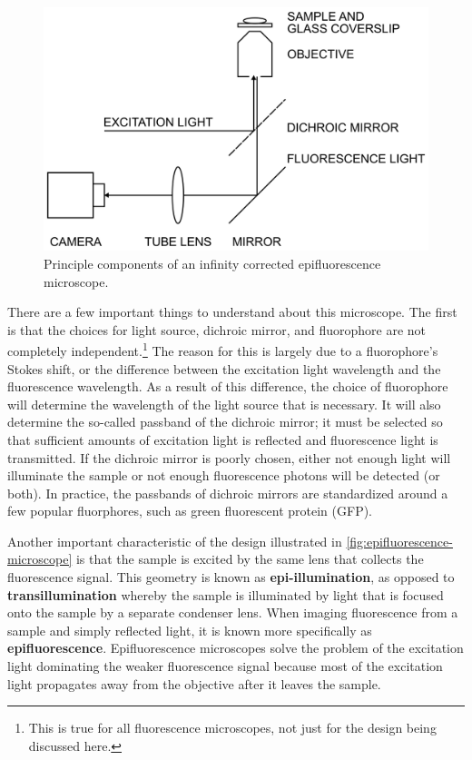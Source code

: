 \documentclass[10pt,a4paper]{book}
\begin{document}
\begin{figure}[ht]
    \centering
    \includegraphics{epifluorescence-microscope.png}
    \caption{Principle components of an infinity corrected epifluorescence microscope.}
    \label{fig:epifluorescence-microscope}
\end{figure}

There are a few important things to understand about this microscope. The first is that the choices for light source, dichroic mirror, and fluorophore are not completely independent.\footnote{This is true for all fluorescence microscopes, not just for the design being discussed here.} The reason for this is largely due to a fluorophore's Stokes shift, or the difference between the excitation light wavelength and the fluorescence wavelength. As a result of this difference, the choice of fluorophore will determine the wavelength of the light source that is necessary. It will also determine the so-called passband of the dichroic mirror; it must be selected so that sufficient amounts of excitation light is reflected and fluorescence light is transmitted. If the dichroic mirror is poorly chosen, either not enough light will illuminate the sample or not enough fluorescence photons will be detected (or both). In practice, the passbands of dichroic mirrors are standardized around a few popular fluorphores, such as green fluorescent protein (GFP).

Another important characteristic of the design illustrated in \autoref{fig:epifluorescence-microscope} is that the sample is excited by the same lens that collects the fluorescence signal. This geometry is known as \textbf{epi-illumination}, as opposed to \textbf{transillumination} whereby the sample is illuminated by light that is focused onto the sample by a separate condenser lens. When imaging fluorescence from a sample and simply reflected light, it is known more specifically as \textbf{epifluorescence}. Epifluorescence microscopes solve the problem of the excitation light dominating the weaker fluorescence signal because most of the excitation light propagates away from the objective after it leaves the sample.
\end{document}
